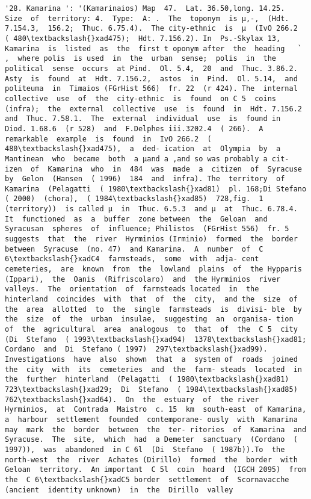 \documentclass[11pt]{article}
\begin{document}
\begin{Verbatim}[commandchars=\\\{\}]
         '28. Kamarina ': '(Kamarinaios) Map  47.  Lat. 36.50,long. 14.25.  Size  of  territory: 4.  Type:  A: .  The  toponym  is µ,-,  (Hdt. 7.154.3,  156.2;  Thuc. 6.75.4).  The city-ethnic  is  µ  (IvO 266.2  ( 480\textbackslash{}xad475);  Hdt. 7.156.2). In  Ps.-Skylax 13,  Kamarina  is  listed  as  the  first t oponym after  the  heading   ` ,  where polis  is used  in  the  urban  sense;  polis  in  the  political  sense  occurs  at Pind.  Ol. 5.4,  20  and  Thuc. 3.86.2.  Asty  is  found  at  Hdt. 7.156.2,  astos  in  Pind.  Ol. 5.14,  and  politeuma  in  Timaios (FGrHist 566)  fr. 22  (r 424). The  internal  collective  use  of  the  city-ethnic  is  found  on C 5  coins  (infra);  the  external  collective  use  is  found  in  Hdt. 7.156.2  and  Thuc. 7.58.1.  The  external  individual  use  is  found in  Diod. 1.68.6  (r 528)  and  F.Delphes iii.3202.4  ( 266).  A remarkable  example  is  found  in  IvO 266.2  ( 480\textbackslash{}xad475),  a  ded- ication  at  Olympia  by  a  Mantinean  who  became  both  a µand a ,and so was probably a cit- izen  of  Kamarina  who  in  484  was  made  a  citizen  of  Syracuse by  Gelon  (Hansen  ( 1996)  184  and  infra). The  territory  of  Kamarina  (Pelagatti  ( 1980\textbackslash{}xad81)  pl. 168;Di Stefano  ( 2000)  (chora),  ( 1984\textbackslash{}xad85)  728,fig.  1  (territory))  is called µ  in  Thuc. 6.5.3  and µ  at  Thuc. 6.78.4.  It  functioned  as  a  buffer  zone between  the  Geloan  and  Syracusan  spheres  of  influence; Philistos  (FGrHist 556)  fr. 5  suggests  that  the  river  Hyrminios (Irminio)  formed  the  border  between  Syracuse  (no. 47)  and Kamarina.  A  number  of  C 6\textbackslash{}xadC4  farmsteads,  some  with  adja- cent  cemeteries,  are  known  from  the  lowland  plains  of  the Hypparis  (Ippari),  the  Oanis  (Rifriscolaro)  and  the Hyrminios  river  valleys.  The  orientation  of  farmsteads located  in  the  hinterland  coincides  with  that  of  the  city,  and the  size  of  the  area  allotted  to  the  single  farmsteads  is  divisi- ble  by  the  size  of  the  urban  insulae,  suggesting  an  organisa- tion  of  the  agricultural  area  analogous  to  that  of  the  C 5  city (Di  Stefano  ( 1993\textbackslash{}xad94)  1378\textbackslash{}xad81;  Cordano  and  Di  Stefano ( 1997)  297\textbackslash{}xad99).  Investigations  have  also  shown  that  a  system of  roads  joined  the  city  with  its  cemeteries  and  the  farm- steads  located  in  the  further  hinterland  (Pelagatti  ( 1980\textbackslash{}xad81) 723\textbackslash{}xad29;  Di  Stefano  ( 1984\textbackslash{}xad85)  762\textbackslash{}xad64).  On  the  estuary  of  the river  Hyrminios,  at  Contrada  Maistro  c. 15  km  south-east  of Kamarina,  a  harbour  settlement  founded  contemporane- ously  with  Kamarina  may  mark  the  border  between  the  ter- ritories  of  Kamarina  and  Syracuse.  The  site,  which  had  a Demeter  sanctuary  (Cordano  ( 1997)),  was  abandoned  in C 6l  (Di  Stefano  ( 1987b)).To  the  north-west  the  river  Achates (Dirillo)  formed  the  border  with  Geloan  territory.  An important  C 5l  coin  hoard  (IGCH 2095)  from  the  C 6\textbackslash{}xadC5 border  settlement  of  Scornavacche  (ancient  identity unknown)  in  the  Dirillo  valley 
\end{Verbatim}
\end{document}
